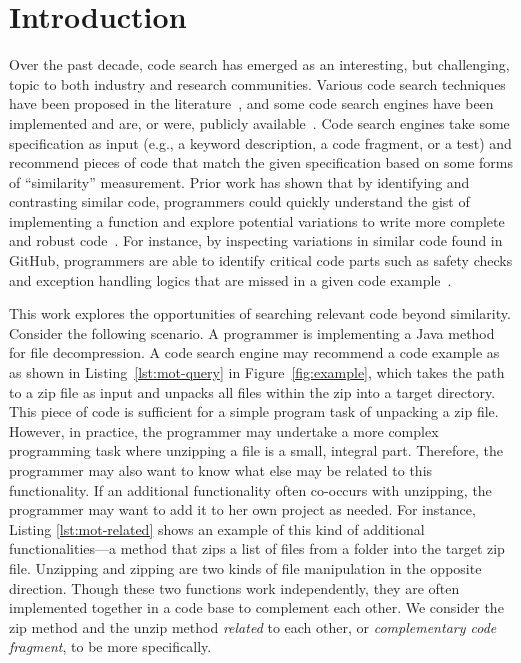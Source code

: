 \section{Introduction}
\label{sec:intro}
Over the past decade, code search has emerged as an interesting, but
challenging, topic to both industry and research communities. Various code search
techniques have been proposed in the
literature~\cite{bajracharya2009sourcerer,reiss2009semantics,lazzarini2009applying,mcmillan2012exemplar}, and
some code search engines have been implemented and are, or were, publicly
available~\cite{googlesearch, github,codase,krugle,ohloh,searchcode}. Code search engines 
take some specification as input (e.g., a keyword description, a code fragment, or a test) and 
recommend pieces of code that match the given specification based on some forms of ``similarity'' measurement. Prior work has shown that by identifying and contrasting similar code, programmers could quickly understand the gist of implementing a function and explore potential variations to write more complete and robust code~\cite{zhang2019analyzing, luan2019aroma}. For instance, by inspecting variations in similar code found in GitHub, programmers are able to identify critical code parts such as safety checks and exception handling logics that are missed in a given code example~\cite{zhang2019analyzing}.


This work explores the opportunities of searching relevant code beyond similarity. Consider
the following scenario. A programmer is implementing a Java method for
file decompression. A code search engine may recommend a code example as as shown in 
Listing~\ref{lst:mot-query} in Figure~\ref{fig:example}, which takes the path to a zip file as input and
unpacks all files within the zip into a target directory.  This piece of code is sufficient for 
a simple program task of unpacking a zip file. However, in practice, the programmer 
may undertake a more complex programming task where unzipping a file is a small,
integral part. Therefore, the programmer may also want to know what else may be
related to this functionality. 
 If an additional functionality often co-occurs with unzipping, the programmer may want to add it
to her own project as needed. 
For instance, Listing \ref{lst:mot-related} shows an example of this kind of additional 
functionalities---a method that zips a list of files from a folder into the target zip file. Unzipping
and zipping are two kinds of file manipulation in the opposite direction. 
Though these two functions work independently, they are often implemented together in a code base to complement each other. We consider the zip method and the unzip method {\em related} to each other, or {\em complementary code fragment}, to be more specifically.

